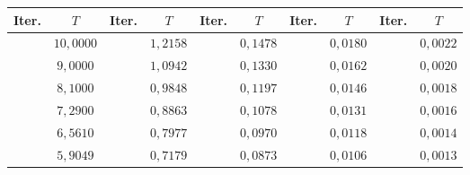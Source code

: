 \begin{table}[H]
\centering
\scriptsize
\setlength{\tabcolsep}{3pt}
\renewcommand{\arraystretch}{1.15}
\begin{tabular}{|c|c|c|c|c|c|c|c|c|c|}
\hline
\rowcolor{encabezado}\textbf{Iter.} & \textbf{$T$} & \textbf{Iter.} & \textbf{$T$} & \textbf{Iter.} & \textbf{$T$} & \textbf{Iter.} & \textbf{$T$} & \textbf{Iter.} & \textbf{$T$} \\
\hline
\cellcolor{iteracion}{\bfseries\boldmath $1$} & $10{,}0000$ & \cellcolor{iteracion}{\bfseries\boldmath $21$} & $1{,}2158$ & \cellcolor{iteracion}{\bfseries\boldmath $41$} & $0{,}1478$ & \cellcolor{iteracion}{\bfseries\boldmath $61$} & $0{,}0180$ & \cellcolor{iteracion}{\bfseries\boldmath $81$} & $0{,}0022$ \\
\hline
\cellcolor{iteracion}{\bfseries\boldmath $2$} & \cellcolor{cebra}$9{,}0000$ & \cellcolor{iteracion}{\bfseries\boldmath $22$} & \cellcolor{cebra}$1{,}0942$ & \cellcolor{iteracion}{\bfseries\boldmath $42$} & \cellcolor{cebra}$0{,}1330$ & \cellcolor{iteracion}{\bfseries\boldmath $62$} & \cellcolor{cebra}$0{,}0162$ & \cellcolor{iteracion}{\bfseries\boldmath $82$} & \cellcolor{cebra}$0{,}0020$ \\
\hline
\cellcolor{iteracion}{\bfseries\boldmath $3$} & $8{,}1000$ & \cellcolor{iteracion}{\bfseries\boldmath $23$} & $0{,}9848$ & \cellcolor{iteracion}{\bfseries\boldmath $43$} & $0{,}1197$ & \cellcolor{iteracion}{\bfseries\boldmath $63$} & $0{,}0146$ & \cellcolor{iteracion}{\bfseries\boldmath $83$} & $0{,}0018$ \\
\hline
\cellcolor{iteracion}{\bfseries\boldmath $4$} & \cellcolor{cebra}$7{,}2900$ & \cellcolor{iteracion}{\bfseries\boldmath $24$} & \cellcolor{cebra}$0{,}8863$ & \cellcolor{iteracion}{\bfseries\boldmath $44$} & \cellcolor{cebra}$0{,}1078$ & \cellcolor{iteracion}{\bfseries\boldmath $64$} & \cellcolor{cebra}$0{,}0131$ & \cellcolor{iteracion}{\bfseries\boldmath $84$} & \cellcolor{cebra}$0{,}0016$ \\
\hline
\cellcolor{destacado}{\bfseries\boldmath $5$} & \cellcolor{destacado}$6{,}5610$ & \cellcolor{iteracion}{\bfseries\boldmath $25$} & $0{,}7977$ & \cellcolor{iteracion}{\bfseries\boldmath $45$} & $0{,}0970$ & \cellcolor{iteracion}{\bfseries\boldmath $65$} & $0{,}0118$ & \cellcolor{iteracion}{\bfseries\boldmath $85$} & $0{,}0014$ \\
\hline
\cellcolor{destacado}{\bfseries\boldmath $6$} & \cellcolor{destacado}$5{,}9049$ & \cellcolor{iteracion}{\bfseries\boldmath $26$} & \cellcolor{cebra}$0{,}7179$ & \cellcolor{iteracion}{\bfseries\boldmath $46$} & \cellcolor{cebra}$0{,}0873$ & \cellcolor{iteracion}{\bfseries\boldmath $66$} & \cellcolor{cebra}$0{,}0106$ & \cellcolor{iteracion}{\bfseries\boldmath $86$} & \cellcolor{cebra}$0{,}0013$ \\

\end{tabular}
\end{table}
